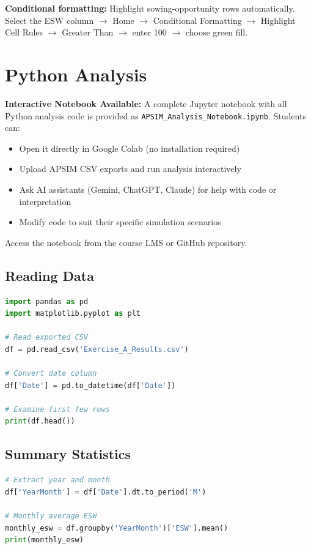 \begin{tipbox}
\textbf{Conditional formatting:} Highlight sowing-opportunity rows automatically.\\
Select the ESW column $\to$ Home $\to$ Conditional Formatting $\to$ Highlight Cell Rules $\to$ Greater Than $\to$ enter 100 $\to$ choose green fill.
\end{tipbox}

\section{Python Analysis}

\begin{tipbox}
\textbf{Interactive Notebook Available:} A complete Jupyter notebook with all Python analysis code is provided as \texttt{APSIM\_Analysis\_Notebook.ipynb}. Students can:
\begin{itemize}
  \item Open it directly in Google Colab (no installation required)
  \item Upload APSIM CSV exports and run analysis interactively
  \item Ask AI assistants (Gemini, ChatGPT, Claude) for help with code or interpretation
  \item Modify code to suit their specific simulation scenarios
\end{itemize}
Access the notebook from the course LMS or GitHub repository.
\end{tipbox}

\subsection{Reading Data}

\begin{lstlisting}[language=Python, caption=Read APSIM output in pandas]
import pandas as pd
import matplotlib.pyplot as plt

# Read exported CSV
df = pd.read_csv('Exercise_A_Results.csv')

# Convert date column
df['Date'] = pd.to_datetime(df['Date'])

# Examine first few rows
print(df.head())
\end{lstlisting}

\subsection{Summary Statistics}

\begin{lstlisting}[language=Python, caption=Calculate monthly averages]
# Extract year and month
df['YearMonth'] = df['Date'].dt.to_period('M')

# Monthly average ESW
monthly_esw = df.groupby('YearMonth')['ESW'].mean()
print(monthly_esw)
\end{lstlisting}

